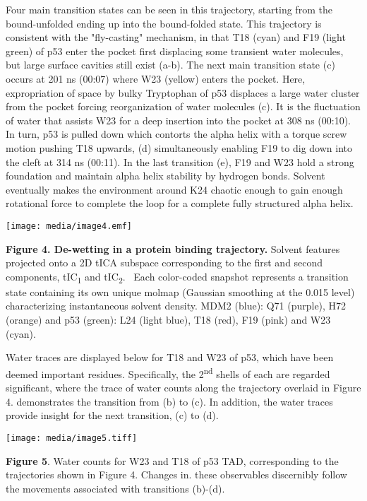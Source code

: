 Four main transition states can be seen in this trajectory, starting
from the bound-unfolded ending up into the bound-folded state. This
trajectory is consistent with the "fly-casting" mechanism, in that T18
(cyan) and F19 (light green) of p53 enter the pocket first displacing
some transient water molecules, but large surface cavities still exist
(a-b). The next main transition state (c) occurs at 201 ns (00:07) where
W23 (yellow) enters the pocket. Here, expropriation of space by bulky
Tryptophan of p53 displaces a large water cluster from the pocket
forcing reorganization of water molecules (c). It is the fluctuation of
water that assists W23 for a deep insertion into the pocket at 308 ns
(00:10). In turn, p53 is pulled down which contorts the alpha helix with
a torque screw motion pushing T18 upwards, (d) simultaneously enabling
F19 to dig down into the cleft at 314 ns (00:11). In the last transition
(e), F19 and W23 hold a strong foundation and maintain alpha helix
stability by hydrogen bonds. Solvent eventually makes the environment
around K24 chaotic enough to gain enough rotational force to complete
the loop for a complete fully structured alpha helix.

\texttt{[image: media/image4.emf]}

\textbf{Figure 4. De-wetting in a protein binding trajectory.} Solvent
features projected onto a 2D tICA subspace corresponding to the first
and second components, tIC\textsubscript{1} and tIC\textsubscript{2}.~
Each color-coded snapshot represents a transition state containing its
own unique molmap (Gaussian smoothing at the 0.015 level) characterizing
instantaneous solvent density. MDM2 (blue): Q71 (purple), H72 (orange)
and p53 (green): L24 (light blue), T18 (red), F19 (pink) and W23 (cyan).

Water traces are displayed below for T18 and W23 of p53, which have been
deemed important residues. Specifically, the 2\textsuperscript{nd}
shells of each are regarded significant, where the trace of water counts
along the trajectory overlaid in Figure 4. demonstrates the transition
from (b) to (c). In addition, the water traces provide insight for the
next transition, (c) to (d).

\texttt{[image: media/image5.tiff]}

\textbf{Figure 5}. Water counts for W23 and T18 of p53 TAD,
corresponding to the trajectories shown in Figure 4. Changes in. these
observables discernibly follow the movements associated with transitions
(b)-(d).

